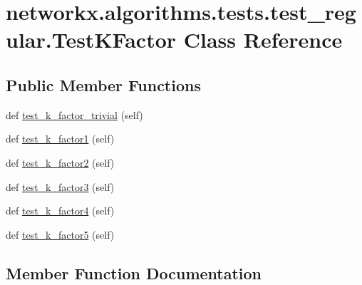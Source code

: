 \hypertarget{classnetworkx_1_1algorithms_1_1tests_1_1test__regular_1_1TestKFactor}{}\section{networkx.\+algorithms.\+tests.\+test\+\_\+regular.\+Test\+K\+Factor Class Reference}
\label{classnetworkx_1_1algorithms_1_1tests_1_1test__regular_1_1TestKFactor}
\subsection*{Public Member Functions}
\begin{DoxyCompactItemize}
\item 
def \hyperlink{classnetworkx_1_1algorithms_1_1tests_1_1test__regular_1_1TestKFactor_aeb8e2f88e2aacd97e8e5c1c85b9537f3}{test\+\_\+k\+\_\+factor\+\_\+trivial} (self)
\item 
def \hyperlink{classnetworkx_1_1algorithms_1_1tests_1_1test__regular_1_1TestKFactor_a3143385f27b358ab24469988a9559c7d}{test\+\_\+k\+\_\+factor1} (self)
\item 
def \hyperlink{classnetworkx_1_1algorithms_1_1tests_1_1test__regular_1_1TestKFactor_ace856639e7209e98af86bda4f89af41b}{test\+\_\+k\+\_\+factor2} (self)
\item 
def \hyperlink{classnetworkx_1_1algorithms_1_1tests_1_1test__regular_1_1TestKFactor_ad37aae9b37a91302077ae75639156dce}{test\+\_\+k\+\_\+factor3} (self)
\item 
def \hyperlink{classnetworkx_1_1algorithms_1_1tests_1_1test__regular_1_1TestKFactor_ae607ca5443ea93fdc30a7e39568ff678}{test\+\_\+k\+\_\+factor4} (self)
\item 
def \hyperlink{classnetworkx_1_1algorithms_1_1tests_1_1test__regular_1_1TestKFactor_ae50997f0dcccc2bfba2e4779d3fe6801}{test\+\_\+k\+\_\+factor5} (self)
\end{DoxyCompactItemize}


\subsection{Member Function Documentation}
\mbox{\label{classnetworkx_1_1algorithms_1_1tests_1_1test__regular_1_1TestKFactor_a3143385f27b358ab24469988a9559c7d}} 
